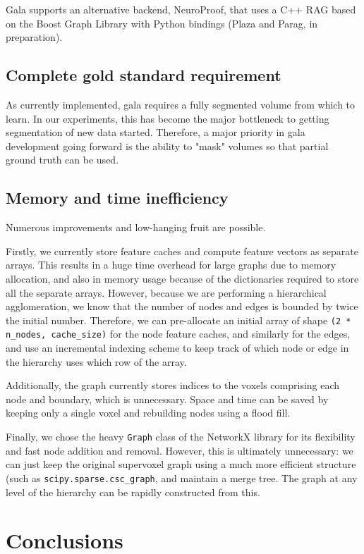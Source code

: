 \documentclass{frontiersSCNS} %
\begin{document}
Gala supports an alternative backend, NeuroProof, that uses a C++ RAG based on the Boost Graph Library with Python bindings (Plaza and Parag, in preparation).

\subsection{Complete gold standard requirement}

As currently implemented, gala requires a fully segmented volume from which to learn.
In our experiments, this has become the major bottleneck to getting segmentation of new data started.
Therefore, a major priority in gala development going forward is the ability to "mask" volumes so that partial ground truth can be used.

\subsection{Memory and time inefficiency}

Numerous improvements and low-hanging fruit are possible.

Firstly, we currently store feature caches and compute feature vectors as separate arrays.
This results in a huge time overhead for large graphs due to memory allocation, and also in memory usage because of the dictionaries required to store all the separate arrays.
However, because we are performing a hierarchical agglomeration, we know that the number of nodes and edges is bounded by twice the initial number.
Therefore, we can pre-allocate an initial array of shape \texttt{(2 * n\_nodes, cache\_size)} for the node feature caches, and similarly for the edges, and use an incremental indexing scheme to keep track of which node or edge in the hierarchy uses which row of the array.

Additionally, the graph currently stores indices to the voxels comprising each node and boundary, which is unnecessary.
Space and time can be saved by keeping only a single voxel and rebuilding nodes using a flood fill.

Finally, we chose the heavy \texttt{Graph} class of the NetworkX library for its flexibility and fast node addition and removal.
However, this is ultimately unnecessary: we can just keep the original supervoxel graph using a much more efficient structure (such as \texttt{scipy.sparse.csc\_graph}, and maintain a merge tree.
The graph at any level of the hierarchy can be rapidly constructed from this.


\section{Conclusions}
\end{document}
